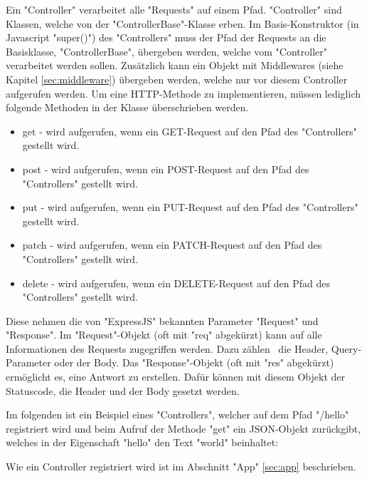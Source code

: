 \label{sec:controller}

Ein "Controller" verarbeitet alle "Requests" auf einem Pfad. 
"Controller" sind Klassen, welche von der "ControllerBase"-Klasse erben. 
Im Basis-Konstruktor (in Javascript "{\ttfamily super()}") des "Controllers" muss der Pfad der Requests an die Basisklasse, "ControllerBase", übergeben werden, welche vom "Controller" verarbeitet werden sollen. 
Zusätzlich kann ein Objekt mit Middlewares (siehe Kapitel \ref{sec:middleware}) übergeben werden, welche nur vor diesem Controller aufgerufen werden. 
Um eine HTTP-Methode zu implementieren, müssen lediglich folgende Methoden in der Klasse überschrieben werden. 

\begin{itemize}
    \item {\ttfamily get} - wird aufgerufen, wenn ein GET-Request auf den Pfad des "Controllers" gestellt wird.
    \item {\ttfamily post} - wird aufgerufen, wenn ein POST-Request auf den Pfad des "Controllers" gestellt wird.
    \item {\ttfamily put} - wird aufgerufen, wenn ein PUT-Request auf den Pfad des "Controllers" gestellt wird.
    \item {\ttfamily patch} - wird aufgerufen, wenn ein PATCH-Request auf den Pfad des "Controllers" gestellt wird.
    \item {\ttfamily delete} - wird aufgerufen, wenn ein DELETE-Request auf den Pfad des "Controllers" gestellt wird.
\end{itemize}

Diese nehmen die von "ExpressJS" bekannten Parameter "Request" und "Response". 
Im "Request"-Objekt (oft mit "req" abgekürzt) kann auf alle Informationen des Requests zugegriffen werden. Dazu zählen \zb\ die Header, Query-Parameter oder der Body.
Das "Response"-Objekt (oft mit "res" abgekürzt) ermöglicht es, eine Antwort zu erstellen. Dafür können mit diesem Objekt der Statuscode, die Header und der Body gesetzt werden.

Im folgenden ist ein Beispiel eines "Controllers", welcher auf dem Pfad "/hello" registriert wird und beim Aufruf der Methode "get" ein JSON-Objekt zurückgibt, welches in der Eigenschaft "hello" den Text "world" beinhaltet:


Wie ein Controller registriert wird ist im Abschnitt "App" \ref{sec:app} beschrieben. 